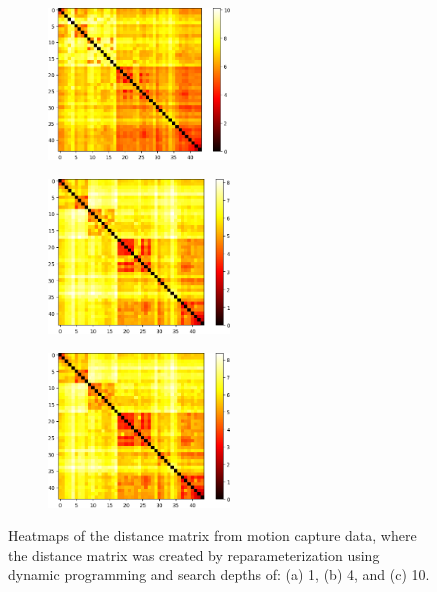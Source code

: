 \begin{figure}
    \centering
    \begin{subfigure}{\textwidth}
        \centering
        \includegraphics[width=0.53\textwidth]{figures/motion-capture-data/heatmaps/dynprog_1.png}
        \caption{}
        \label{fig:heatmaps-dynprog-1}
    \end{subfigure}
    \begin{subfigure}{\textwidth}
        \centering
        \includegraphics[width=0.53\textwidth]{figures/motion-capture-data/heatmaps/dynprog_4.png}
        \caption{}
        \label{fig:heatmaps-dynprog-4}
    \end{subfigure}
    \begin{subfigure}{\textwidth}
        \centering
        \includegraphics[width=0.53\textwidth]{figures/motion-capture-data/heatmaps/dynprog_10.png}
        \caption{}
        \label{fig:heatmaps-dynprog-10}
    \end{subfigure}
    \caption[Heatmap: Motion Capture Data Classification utilizing Reparameterization]{Heatmaps of the distance matrix from motion capture data, where the distance matrix was created by reparameterization using dynamic programming and search depths of: (a) 1, (b) 4, and (c) 10.}
    \label{fig:heatmaps-dynprog}
\end{figure}